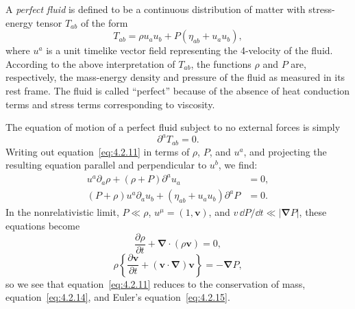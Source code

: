A \emph{perfect fluid} is defined to be a continuous distribution of matter with
stress-energy tensor \(T_{ab}\) of the form
\begin{equation}
  T_{ab}=\rho u_au_b+P(\eta_{ab}+u_au_b) ,
  \tag{4.2.10}\label{eq:4.2.10}
\end{equation}
where \(u^a\) is a unit timelike vector field representing the 4-velocity of the
fluid. According to the above interpretation of \(T_{ab}\), the functions
\(\rho\) and \(P\) are, respectively, the mass-energy density and pressure of
the fluid as measured in its rest frame. The fluid is called
\textquotedblleft perfect\textquotedblright{} because of the absence of heat
conduction terms and stress terms corresponding to viscosity.

The equation of motion of a perfect fluid subject to no external forces is simply
\begin{equation}
  \partial^aT_{ab}=0 .
  \tag{4.2.11}\label{eq:4.2.11}
\end{equation}
Writing out equation~\eqref{eq:4.2.11} in terms of \(\rho\), \(P\), and
\(u^a\), and projecting the resulting equation parallel and perpendicular to
\(u^b\), we find:
\begin{align}
  u^a\partial_a\rho+(\rho+P)\partial^au_a&=0 ,
    \tag{4.2.12}\label{eq:4.2.12}\\
  (P+\rho)u^a\partial_au_b+(\eta_{ab}+u_au_b)\partial^aP&=0 .
    \tag{4.2.13}\label{eq:4.2.13}
\end{align}
In the nonrelativistic limit, \(P\ll\rho\), \(u^\mu=(1,\mathbf{v})\), and
\(v\,\dd P/\dd t\ll\lvert\boldsymbol{\nabla} P\rvert\), these equations become
\begin{equation}
  \frac{\partial\rho}{\partial t}+\boldsymbol{\nabla}\mathbin{\cdot}(\rho\mathbf{v})=0 ,
  \tag{4.2.14}\label{eq:4.2.14}
\end{equation}
\begin{equation}
  \rho\left\{\frac{\partial\mathbf{v}}{\partial t}
  +(\mathbf{v}\mathbin{\cdot}\boldsymbol{\nabla})\mathbf{v}\right\}=-\boldsymbol{\nabla} P ,
  \tag{4.2.15}\label{eq:4.2.15}
\end{equation}
so we see that equation~\eqref{eq:4.2.11} reduces to the conservation of mass,
equation~\eqref{eq:4.2.14}, and Euler's equation~\eqref{eq:4.2.15}.

